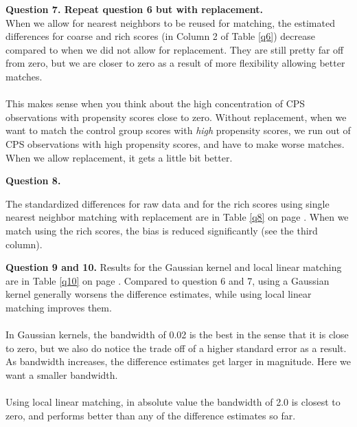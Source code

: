 \documentclass[12pt]{article}
\begin{document}
\bigskip
\textbf{Question 7. Repeat question 6 but with replacement. }\\
When we allow for nearest neighbors to be reused for matching, the estimated differences for coarse and rich scores (in Column 2 of Table \ref{q6}) decrease compared to when we did not allow for replacement. They are still pretty far off from zero, but we are closer to zero as a result of more flexibility allowing better matches. 
\\\\
This makes sense when you think about the high concentration of CPS observations with propensity scores close to zero. Without replacement, when we want to match the control group scores with \textit{high} propensity scores, we run out of CPS observations with high propensity scores, and have to make worse matches. When we allow replacement, it gets a little bit better. 

\bigskip
\textbf{Question 8.}

The standardized differences for raw data and for the rich scores using single nearest neighbor matching with replacement are in Table \ref{q8} on page \pageref{q8}. 
When we match using the rich scores, the bias is reduced significantly (see the third column).

\bigskip
\textbf{Question 9 and 10.}
Results for the Gaussian kernel and local linear matching are in Table \ref{q10} on page \pageref{q10}. Compared to question 6 and 7, using a Gaussian kernel generally worsens the difference estimates, while using local linear matching improves them.\\\\ 
In Gaussian kernels, the bandwidth of 0.02 is the best in the sense that it is close to zero, but we also do notice the trade off of a higher standard error as a result. As bandwidth increases, the difference estimates get larger in magnitude. Here we want a smaller bandwidth. 
\\\\
Using local linear matching, in absolute value the bandwidth of 2.0 is closest to zero, and performs better than any of the difference estimates so far. 

\end{document}

